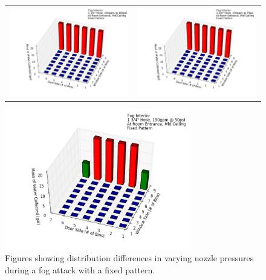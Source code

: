\documentclass{article}
\begin{document}
\clearpage


\begin{figure}[ht]
\begin{tabular*}{\textwidth}{lr}
\includegraphics[width=3.2in]{../ADD_Analysis/Figures/15-12-09_113802_Datafile_Fog_Interior.png} &
\includegraphics[width=3.2in]{../ADD_Analysis/Figures/15-12-09_120821_Datafile_Fog_Interior.png} \\
\end{tabular*}
\centering
\includegraphics[width=3.2in]{../ADD_Analysis/Figures/15-12-09_123142_Datafile_Fog_Interior.png}
\caption{Figures showing distribution differences in varying nozzle pressures during a fog attack with a fixed pattern.}
\label{fig:Interior_Varying_Nozzle_Pressure_Fog_Fixed_Pattern}
\end{figure}
\end{document}
